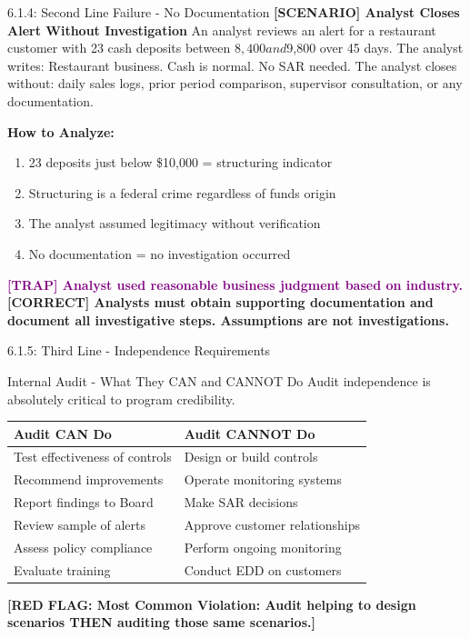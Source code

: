 \documentclass[11pt,a4paper]{beamer}
\newcommand{\trap}[1]{\textcolor{purple}{\textbf{[TRAP] #1}}}
\newcommand{\correct}[1]{\textcolor{green!50!black}{\textbf{[CORRECT] #1}}}
\newcommand{\scenario}[1]{\textcolor{blue!70!black}{\textbf{[SCENARIO] #1}}}
\newcommand{\redflag}[1]{\textcolor{red!80!black}{\textbf{[RED FLAG: #1]}}}
\begin{document}
\begin{frame}{6.1.4: Second Line Failure - No Documentation}
	\scenario{Analyst Closes Alert Without Investigation}
	An analyst reviews an alert for a restaurant customer with 23 cash deposits between $8,400 and $9,800 over 45 days. The analyst writes: Restaurant business. Cash is normal. No SAR needed. The analyst closes without: daily sales logs, prior period comparison, supervisor consultation, or any documentation.
	
	\vspace{0.1cm}
	\textbf{How to Analyze:}
	\begin{enumerate}
		\item 23 deposits just below \$10,000 = structuring indicator
		\item Structuring is a federal crime regardless of funds origin
		\item The analyst assumed legitimacy without verification
		\item No documentation = no investigation occurred
	\end{enumerate}
	\trap{Analyst used reasonable business judgment based on industry.}
	\correct{Analysts must obtain supporting documentation and document all investigative steps. Assumptions are not investigations.}
\end{frame}

\begin{frame}{6.1.5: Third Line - Independence Requirements}
	\begin{block}{Internal Audit - What They CAN and CANNOT Do}
		Audit independence is absolutely critical to program credibility.
	\end{block}
	\begin{tabular}{p{}|p{}}
		\hline
		\rowcolor{lightgray}
		\textbf{Audit CAN Do} & \textbf{Audit CANNOT Do} \\
		\hline
		Test effectiveness of controls & Design or build controls \\
		Recommend improvements & Operate monitoring systems \\
		Report findings to Board & Make SAR decisions \\
		Review sample of alerts & Approve customer relationships \\
		Assess policy compliance & Perform ongoing monitoring \\
		Evaluate training & Conduct EDD on customers \\
		\hline
	\end{tabular}
	\redflag{Most Common Violation: Audit helping to design scenarios THEN auditing those same scenarios.}
\end{frame}
\end{document}
